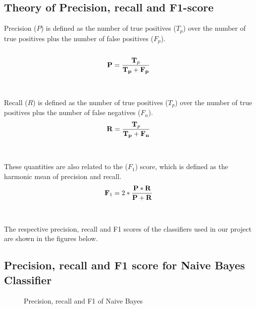 \documentclass[oneside,a4paper,12pt]{book}
\begin{document}
\subsection{Theory of Precision, recall and F1-score}
Precision ($P$) is defined as the number of true positives ($T_p$) over the number of true positives plus the number of false positives ($F_p$).\\\\
\begin{equation}
\mathbf P = \frac{\mathbf T_p}{\mathbf{T_p + F_p}} \\\\
\end{equation}
\\\\Recall ($R$) is defined as the number of true positives ($T_p$) over the number of true positives plus the number of false negatives ($F_n$).
\begin{equation}
\mathbf R = \frac{\mathbf T_p}{\mathbf{T_p + F_n}} \\
\end{equation}
\\\\These quantities are also related to the ($F_1$) score, which is defined as the harmonic mean of precision and recall.
\begin{equation}
\mathbf F_1 = 2*\frac{\mathbf {P*R}}{\mathbf{P+R}} \\
\end{equation}
\\\\The respective precision, recall and F1 scores of the classifiers used in our project are shown in the figures below.
\newpage
\subsection{Precision, recall and F1 score for Naive Bayes Classifier}
\begin{center}
	\begin{figure}[!htbp]
		\caption{Precision, recall and F1 of Naive Bayes}
		\label{fig:precision, recall and F1 of Naive Bayes}
	\end{figure}
\end{center} 
\end{document}
